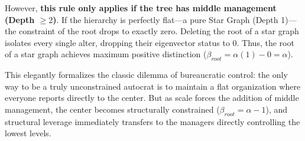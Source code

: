 However, \textbf{this rule only applies if the tree has middle management (Depth $\ge 2$)}. If the hierarchy is perfectly flat—a pure Star Graph (Depth 1)—the constraint of the root drops to exactly zero. Deleting the root of a star graph isolates every single alter, dropping their eigenvector status to 0. Thus, the root of a star graph achieves maximum positive distinction ($\beta_{root} = \alpha(1) - 0 = \alpha$). 

This elegantly formalizes the classic dilemma of bureaucratic control: the only way to be a truly unconstrained autocrat is to maintain a flat organization where everyone reports directly to the center. But as scale forces the addition of middle management, the center becomes structurally constrained ($\beta_{root} = \alpha - 1$), and structural leverage immediately transfers to the managers directly controlling the lowest levels.